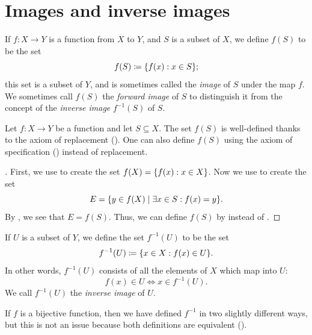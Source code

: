 \section{Images and inverse images}\label{i:sec:3.4}

\begin{defn}\label{i:3.4.1}
  If \(f : X \to Y\) is a function from \(X\) to \(Y\), and \(S\) is a subset of \(X\), we define \(f(S)\) to be the set
  \[
    f(S) \coloneqq \set{f(x) : x \in S};
  \]
  this set is a subset of \(Y\), and is sometimes called the \emph{image} of \(S\) under the map \(f\).
  We sometimes call \(f(S)\) the \emph{forward image} of \(S\) to distinguish it from the concept of the \emph{inverse image} \(f^{-1}(S)\) of \(S\).
\end{defn}

\begin{ac}\label{i:ac:3.4.1}
  Let \(f : X \to Y\) be a function and let \(S \subseteq X\).
  The set \(f(S)\) is well-defined thanks to the axiom of replacement ().
  One can also define \(f(S)\) using the axiom of specification () instead of replacement.
\end{ac}

\begin{proof}[]
  First, we use  to create the set \(f(X) = \left\lbrace f(x) : x \in X\right\rbrace\).
  Now we use  to create the set
  \[
    E = \set{y \in f(X) \mid \exists x \in S : f(x) = y}.
  \]
  By , we see that \(E = f(S)\).
  Thus, we can define \(f(S)\) by  instead of .
\end{proof}

\setcounter{thm}{3}
\begin{defn}\label{i:3.4.4}
  If \(U\) is a subset of \(Y\), we define the set \(f^{-1}(U)\) to be the set
  \[
    f^{-1}(U) \coloneqq \set{x \in X : f(x) \in U}.
  \]
  In other words, \(f^{-1}(U)\) consists of all the elements of \(X\) which map into \(U\):
  \[
    f(x) \in U \iff x \in f^{-1}(U).
  \]
  We call \(f^{-1}(U)\) the \emph{inverse image} of \(U\).
\end{defn}

\setcounter{thm}{6}
\begin{rmk}\label{i:3.4.6}
  If \(f\) is a bijective function, then we have defined \(f^{-1}\) in two slightly different ways, but this is not an issue because both definitions are equivalent ().
\end{rmk}

